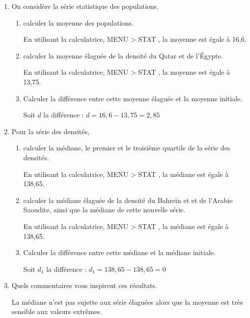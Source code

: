 \begin{enumerate}
\item On considère la série statistique des populations.
\begin{enumerate}
\item calculer la moyenne des populations.

En utilisant la calculatrice, MENU > STAT , la moyenne est égale à 16,6.

\item calculer la moyenne élaguée de la densité du Qatar et de l'Égypte.

En utilisant la calculatrice, MENU > STAT , la moyenne est égale à 13,75.

\item  Calculer la différence entre cette moyenne élaguée et la moyenne initiale.

Soit $d$ la différence : $d = 16,6 - 13,75 = 2,85$
\end{enumerate}
\item Pour la série des densités,

\begin{enumerate}
\item  calculer la médiane, le premier et le troisième quartile de la série des densités.

En utilisant la calculatrice, MENU > STAT , la médiane est égale à 138,65.


\item  calculer la médiane élaguée de la densité du Bahreïn et et de l'Arabie Saoudite, ainsi que la médiane de cette nouvelle série.

En utilisant la calculatrice, MENU > STAT , la médiane est égale à 138,65.

\item  Calculer la différence entre cette médiane et la médiane initiale.

Soit $d_1$ la différence : $d_1 = 138,65 - 138,65 = 0 $

\end{enumerate}
\item Quels commentaires vous inspirent ces résultats.


La médiane n'est pas sujette aux série élaguées alors que la moyenne est très sensible aux valeurs extrêmes.
\end{enumerate}
